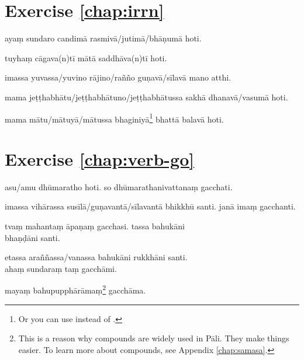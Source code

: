 \section*{Exercise \ref{chap:irrn}}
\begin{answerkey}
\item aya\d m sundaro candim\=a rasmiv\=a/jutim\=a/bh\=a\d num\=a hoti.
\item tuyha\d m c\=agava(n)t\=i m\=at\=a saddh\=ava(n)t\=i hoti. 
\item imassa yuvassa/yuvino r\=ajino/ra\~n\~no gu\d nav\=a/s\=ilav\=a mano atthi.
\item mama je\d t\d thabh\=atu/je\d t\d thabh\=atuno/je\d t\d thabh\=atussa sakh\=a dhanav\=a/vasum\=a hoti.
\item mama m\=atu/m\=atuy\=a/m\=atussa bhaginiy\=a\footnote{Or you can use  instead of .} bhatt\=a balav\=a hoti.
\end{answerkey}

\section*{Exercise \ref{chap:verb-go}}
\begin{answerkey}
\item asu/amu dh\=umaratho hoti. so dh\=umarathanivattana\d m gacchati.
\item imassa vih\=arassa sus\=il\=a/gu\d navant\=a/s\=ilavant\=a bhikkh\=u santi. jan\=a ima\d m gacchanti.
\item tva\d m mahanta\d m \=apa\d na\d m gacchasi. tassa bahuk\=ani \\bha\d n\d d\=ani santi.
\item etassa ara\~n\~nassa/vanassa bahuk\=ani rukkh\=ani santi. \\aha\d m sundara\d m ta\d m gacch\=ami.
\item maya\d m bahupupph\=ar\=ama\d m\footnote{This is a reason why compounds are widely used in P\=ali. They make things easier. To learn more about compounds, see Appendix \ref{chap:samasa}.} gacch\=ama.
\end{answerkey}

